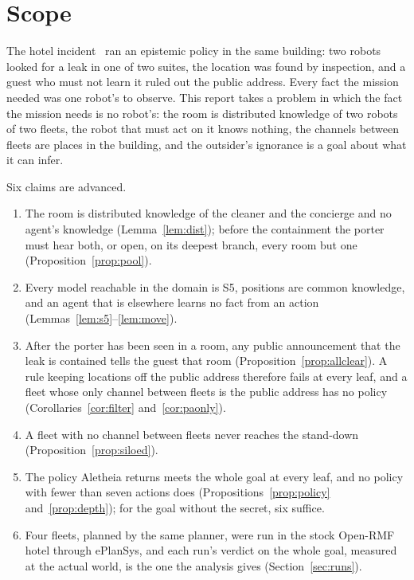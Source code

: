 \documentclass[11pt,a4paper]{article}
\theoremstyle{definition}
\begin{document}
\tableofcontents
\newpage

\section{Scope}
\label{sec:scope}

The hotel incident~\cite{ulises2026hotel} ran an epistemic policy in the same
building: two robots looked for a leak in one of two suites, the location was
found by inspection, and a guest who must not learn it ruled out the public
address. Every fact the mission needed was one robot's to observe. This report
takes a problem in which the fact the mission needs is no robot's: the room is
distributed knowledge of two robots of two fleets, the robot that must act on
it knows nothing, the channels between fleets are places in the building, and
the outsider's ignorance is a goal about what it can infer.

Six claims are advanced.

\begin{enumerate}[leftmargin=1.4em, itemsep=2pt]
  \item The room is distributed knowledge of the cleaner and the concierge and
        no agent's knowledge (Lemma~\ref{lem:dist}); before the containment the
        porter must hear both, or open, on its deepest branch, every room but one
        (Proposition~\ref{prop:pool}).
  \item Every model reachable in the domain is S5, positions are common
        knowledge, and an agent that is elsewhere learns no fact from an action
        (Lemmas~\ref{lem:s5}--\ref{lem:move}).
  \item After the porter has been seen in a room, any public announcement that
        the leak is contained tells the guest that room
        (Proposition~\ref{prop:allclear}). A rule keeping locations off the
        public address therefore fails at every leaf, and a fleet whose only
        channel between fleets is the public address has no policy
        (Corollaries~\ref{cor:filter} and~\ref{cor:paonly}).
  \item A fleet with no channel between fleets never reaches the stand-down
        (Proposition~\ref{prop:siloed}).
  \item The policy Aletheia returns meets the whole goal at every leaf, and no
        policy with fewer than seven actions does
        (Propositions~\ref{prop:policy} and~\ref{prop:depth}); for the goal
        without the secret, six suffice.
  \item Four fleets, planned by the same planner, were run in the stock
        Open-RMF hotel through ePlanSys, and each run's verdict on the whole goal,
        measured at the actual world, is the one the analysis gives
        (Section~\ref{sec:runs}).
\end{enumerate}
\end{document}
